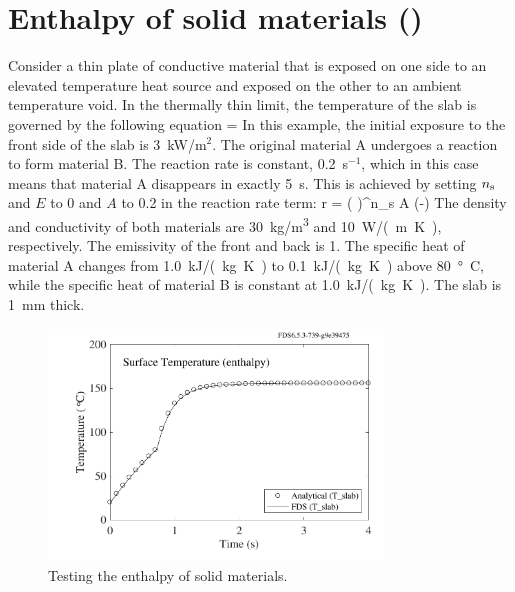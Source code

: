 \documentclass[11pt]{book}
\begin{document}
\clearpage

\section{Enthalpy of solid materials (\texorpdfstring{}{enthalpy})}

Consider a thin plate of conductive material that is exposed on one side to an elevated temperature heat source and exposed on the
other to an ambient temperature void. In the thermally thin limit, the temperature of the slab is governed by the following equation
\be
    = 
\ee
In this example, the initial exposure to the front side of the slab is
3~kW/m$^2$. The original material A undergoes a reaction to form material B.  The reaction rate is constant, 0.2~s$^{-1}$, which in this
case means that material A disappears in exactly 5~s. This is achieved by setting $n_{\rm s}$ and $E$ to 0 and $A$ to 0.2 in the reaction rate term:
\be
    r = \left( \right)^{n_{s}}
    A \; \exp \left(-\right)
\ee
The density and conductivity of both materials are
30~\si{kg/m^3} and 10~\si{W/(m.K)}, respectively. The emissivity of the front and back is 1.  The specific heat of material A changes from
1.0~\si{kJ/(kg.K)} to 0.1~\si{kJ/(kg.K)} above 80~\si{\degree C}, while the specific heat of material B is constant at 1.0~\si{kJ/(kg.K)}. The slab is 1~mm thick.

\begin{figure}[ht]
\begin{center}
\includegraphics[width=3.5in]{SCRIPT_FIGURES/enthalpy}
\end{center}
\caption[The  test case]{Testing the enthalpy of solid materials.}
\label{fig:solid_phase_enthalpy}
\end{figure}
\end{document}
